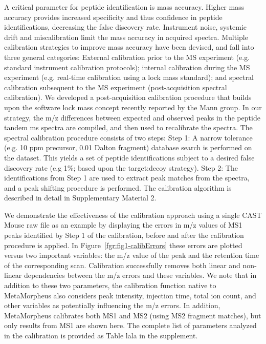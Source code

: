 \documentclass[journal=jprobs,manuscript=article]{achemso}
\begin{document}
A critical parameter for peptide identification is mass accuracy\citep{Scherl_2008}.
Higher mass accuracy provides increased specificity and thus confidence in peptide identifications, decreasing the false discovery rate.
Instrument noise, systemic drift and miscalibration limit the mass accuracy in acquired spectra.
Multiple calibration strategies to improve mass accuracy have been devised, and fall into three general categories: External calibration prior to the MS experiment (e.g. standard instrument calibration protocols); internal calibration during the MS experiment (e.g. real-time calibration using a lock mass standard\citep{Olsen_2005}); and spectral calibration subsequent to the MS experiment (post-acquisition spectral calibration).
We developed a post-acquisition calibration procedure that builds upon the software lock mass concept\citep{Cox_2011} recently reported by the Mann group.
In our strategy, the m/z differences between expected and observed peaks in the peptide tandem ms spectra are compiled, and then used to recalibrate the spectra.
The spectral calibration procedure consists of two steps: Step 1: A narrow tolerance (e.g. 10 ppm precursor, 0.01 Dalton fragment) database search is performed on the dataset.
This yields a set of peptide identifications subject to a desired false discovery rate (e.g 1\%; based upon the target:decoy strategy\citep{Elias_2007}).
Step 2: The identifications from Step 1 are used to extract peak matches from the spectra, and a peak shifting procedure is performed.
The calibration algorithm is described in detail in Supplementary Material 2.

We demonstrate the effectiveness of the calibration approach using a single CAST Mouse raw file as an example by displaying the errors in m/z values of MS1 peaks identified by Step 1 of the calibration, before and after the calibration procedure is applied.
In Figure~\ref{fgr:fig1-calibErrors} these errors are plotted versus two important variables: the m/z value of the peak and the retention time of the corresponding scan.
Calibration successfully removes both linear and non-linear dependencies between the m/z errors and these variables.
We note that in addition to these two parameters, the calibration function native to MetaMorpheus also considers  peak intensity, injection time, total ion count, and other variables as potentially influencing the m/z errors.
In addition, MetaMorpheus calibrates both MS1 and MS2 (using MS2 fragment matches), but only results from MS1 are shown here.
The complete list of parameters analyzed in the calibration is provided as Table lala in the supplement. 
\end{document}
